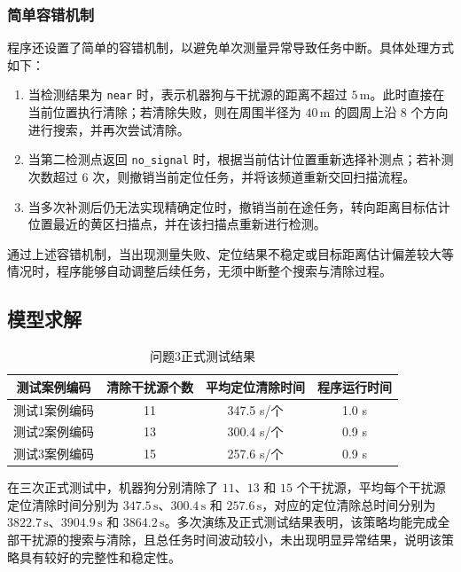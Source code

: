 \documentclass[withoutpreface,bwprint]{cumcmthesis}
\begin{document}
\subsubsection{简单容错机制}
程序还设置了简单的容错机制，以避免单次测量异常导致任务中断。具体处理方式如下：

\begin{enumerate}
    \item 当检测结果为 \texttt{near} 时，表示机器狗与干扰源的距离不超过 $5\,\mathrm{m}$。此时直接在当前位置执行清除；若清除失败，则在周围半径为 $40\,\mathrm{m}$ 的圆周上沿 $8$ 个方向进行搜索，并再次尝试清除。

    \item 当第二检测点返回 \texttt{no\_signal} 时，根据当前估计位置重新选择补测点；若补测次数超过 $6$ 次，则撤销当前定位任务，并将该频道重新交回扫描流程。

    \item 当多次补测后仍无法实现精确定位时，撤销当前在途任务，转向距离目标估计位置最近的黄区扫描点，并在该扫描点重新进行检测。
\end{enumerate}

通过上述容错机制，当出现测量失败、定位结果不稳定或目标距离估计偏差较大等情况时，程序能够自动调整后续任务，无须中断整个搜索与清除过程。

\subsection{模型求解}
\begin{table}[htbp]
    \centering
    \caption{问题3正式测试结果}
    \renewcommand{\arraystretch}{1.6}
    \begin{tabular}{|c|c|c|c|}
        \hline
        测试案例编码 & 清除干扰源个数 & 平均定位清除时间 & 程序运行时间 \\
        \hline
        测试1案例编码 & 11 & 347.5 s/个 & 1.0 s \\
        \hline
        测试2案例编码 & 13 & 300.4 s/个 & 0.9 s \\
        \hline
        测试3案例编码 & 15 & 257.6 s/个 & 0.9 s \\
        \hline
    \end{tabular}
\end{table}

在三次正式测试中，机器狗分别清除了 $11$、$13$ 和 $15$ 个干扰源，平均每个干扰源定位清除时间分别为 $347.5\,\mathrm{s}$、$300.4\,\mathrm{s}$ 和 $257.6\,\mathrm{s}$，对应的定位清除总时间分别为 $3822.7\,\mathrm{s}$、$3904.9\,\mathrm{s}$ 和 $3864.2\,\mathrm{s}$。多次演练及正式测试结果表明，该策略均能完成全部干扰源的搜索与清除，且总任务时间波动较小，未出现明显异常结果，说明该策略具有较好的完整性和稳定性。
\end{document}
